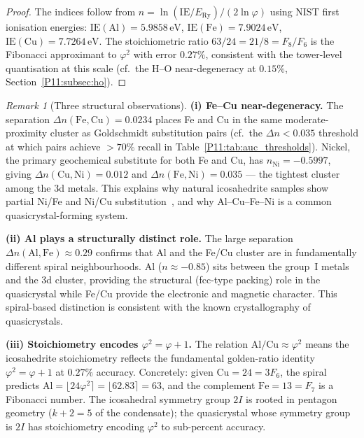 \documentclass[11pt,a4paper]{article}
\theoremstyle{definition}
\theoremstyle{remark}
\newtheorem{remark}[theorem]{Remark}
\newcommand{\vp}{\varphi}
\newcommand{\ERy}{E_{\mathrm{Ry}}}
\begin{document}
\begin{proof}
The indices follow from $n = \ln(\mathrm{IE}/\ERy)/(2\ln\vp)$ using
NIST first ionisation energies:
$\mathrm{IE}(\mathrm{Al}) = 5.9858\,\mathrm{eV}$,
$\mathrm{IE}(\mathrm{Fe}) = 7.9024\,\mathrm{eV}$,
$\mathrm{IE}(\mathrm{Cu}) = 7.7264\,\mathrm{eV}$.
The stoichiometric ratio $63/24 = 21/8 = F_8/F_6$ is the Fibonacci approximant
to $\vp^2$ with error $0.27\%$, consistent with the tower-level
quantisation at this scale (cf.\ the H--O near-degeneracy at $0.15\%$,
Section~\ref{P11:subsec:ho}).
\end{proof}

\begin{remark}[Three structural observations]
\label{P11:rem:icosahedrite_structure}
\textbf{(i) Fe--Cu near-degeneracy.}
The separation $\Delta n(\mathrm{Fe,Cu}) = 0.0234$ places Fe and Cu
in the same moderate-proximity cluster as Goldschmidt substitution pairs
(cf.\ the $\Delta n < 0.035$ threshold at which pairs achieve $>70\%$
recall in Table~\ref{P11:tab:auc_thresholds}).
Nickel, the primary geochemical substitute for both Fe and Cu,
has $n_{\mathrm{Ni}} = -0.5997$, giving
$\Delta n(\mathrm{Cu,Ni}) = 0.012$ and $\Delta n(\mathrm{Fe,Ni}) = 0.035$
--- the tightest cluster among the 3d metals.
This explains why natural icosahedrite samples show partial Ni/Fe
and Ni/Cu substitution~\cite{Bindi2009}, and why
Al--Cu--Fe--Ni is a common quasicrystal-forming system.

\textbf{(ii) Al plays a structurally distinct role.}
The large separation $\Delta n(\mathrm{Al,Fe}) \approx 0.29$
confirms that Al and the Fe/Cu cluster are in fundamentally different
spiral neighbourhoods.
Al ($n \approx -0.85$) sits between the group~I metals and the 3d cluster,
providing the structural (fcc-type packing) role in the quasicrystal
while Fe/Cu provide the electronic and magnetic character.
This spiral-based distinction is consistent with the known crystallography
of quasicrystals.

\textbf{(iii) Stoichiometry encodes $\vp^2 = \vp+1$.}
The relation $\mathrm{Al}/\mathrm{Cu} \approx \vp^2$ means the icosahedrite
stoichiometry reflects the fundamental golden-ratio identity $\vp^2 = \vp+1$
at $0.27\%$ accuracy.
Concretely: given $\mathrm{Cu} = 24 = 3F_6$, the spiral predicts
$\mathrm{Al} = \lfloor 24\vp^2 \rceil = \lfloor 62.83 \rceil = 63$,
and the complement $\mathrm{Fe} = 13 = F_7$ is a Fibonacci number.
The icosahedral symmetry group $2I$ is rooted in pentagon geometry
($k+2=5$ of the condensate); the quasicrystal whose symmetry group
is $2I$ has stoichiometry encoding $\vp^2$ to sub-percent accuracy.
\end{remark}
\end{document}
